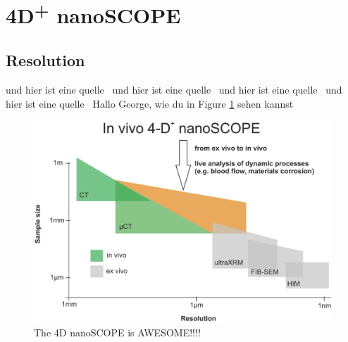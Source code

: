 \documentclass{article}
\begin{document}
\section{4D\textsuperscript{+} nanoSCOPE}

\subsection{Resolution}
und hier ist eine quelle~\cite{Mill2018}
und hier ist eine quelle~\cite{Frangi1998}
und hier ist eine quelle~\cite{YoshinobuSato1998}
\cite{Mill2018}
und hier ist eine quelle~\cite{Carriero2014}
Hallo George, wie du in Figure \ref{figure:NanoscopeResolution} sehen kannst

\begin{figure}[htb]
	\includegraphics[scale=0.1]{Figures/4DnanoSCOPE}
    \caption{The 4D nanoSCOPE is AWESOME!!!!}
    \label{figure:NanoscopeResolution}
\end{figure}




\end{document}
